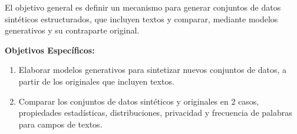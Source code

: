 El objetivo general es definir un mecanismo para generar conjuntos de datos sintéticos estructurados, que incluyen textos y comparar, mediante modelos generativos y su contraparte original.

\textbf{Objetivos Específicos:}
\begin{enumerate}
    \item Elaborar modelos generativos para sintetizar nuevos conjuntos de datos, a partir de los originales que incluyen textos.
    \item Comparar los conjuntos de datos sintéticos y originales en 2 casos, propiedades estadísticas, distribuciones, privacidad y frecuencia de palabras para campos de textos.
\end{enumerate}
